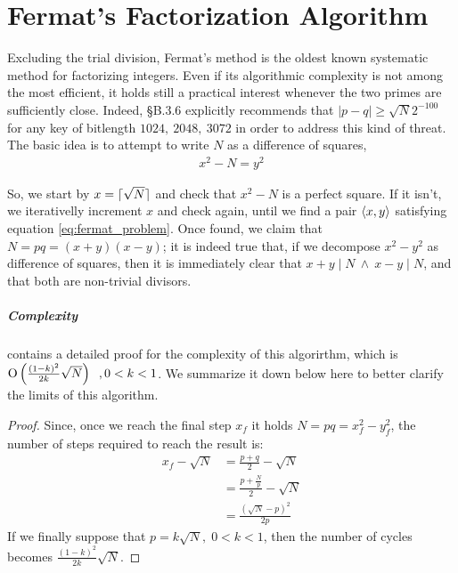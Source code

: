 \chapter{Fermat's Factorization Algorithm \label{chap:fermat}}

Excluding the trial division, Fermat's method is the oldest known systematic
method for factorizing integers. Even if its algorithmic complexity is not
among the most efficient, it holds still a practical interest whenever
the two primes are sufficiently close.
Indeed, \cite{DSS2009} \S B.3.6 explicitly recommends that
$|p-q| \geq \sqrt{N}2^{-100}$
for any key of bitlength $1024,\ 2048,\ 3072$ in order to address this kind of
threat.\\
The basic idea is to attempt to write $N$ as a difference of squares,
\begin{align}
\label{eq:fermat_problem}
x^2 - N = y^2
\end{align}

So, we start by $x = \lceil\sqrt{N}\rceil$ and check that $x^2-N$ is a perfect
square. If it isn't, we iterativelly increment $x$ and check again, until we
find a pair $\langle x, y\rangle$ satisfying equation \ref{eq:fermat_problem}.
Once found, we claim that $N = pq = (x+y)(x-y)$; it is indeed true that, if we
decompose $x^2 - y^2$ as difference of squares, then it is immediately clear
that $x+y \mid N \ \land \  x-y \mid N$, and that both are non-trivial
divisors.

\paragraph{Complexity} \cite{riesel} contains a detailed proof for the
complexity of this algorirthm, which is
$\operatorname{O}\left(\frac{(1-k)^2}{2k} \sqrt{N}\right) \;\;,  0 < k < 1$. We summarize it down
below here to better clarify the limits of this algorithm.

\begin{proof}
  Since, once we reach the final step $x_f$ it holds $N = pq = x_f^2 - y_f^2$,
  the number of steps required to reach the result is:
  \begin{align*}
    x_f - \sqrt{N} &= \frac{p + q}{2} - \sqrt{N} \\
                   &= \frac{p + \frac{N}{p}}{2} - \sqrt{N} \\
                   &= \frac{(\sqrt{N} - p)^2}{2p}
  \end{align*}
  If we finally suppose that $p = k\sqrt{N}, \; 0 < k < 1$, then the number of cycles
  becomes
  $\frac{(1-k)^2}{2k} \sqrt{N}$.
\end{proof}

